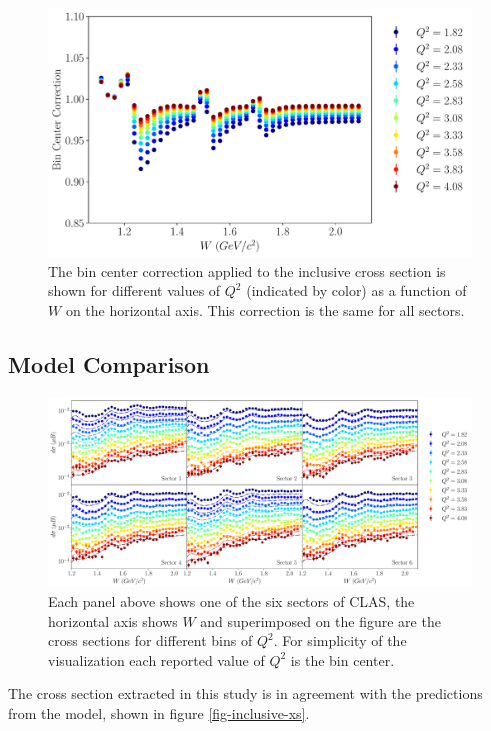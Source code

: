 \begin{figure}
	\centering
	\label{fig-bin-centering-correction} 
	\includegraphics[width=14cm]{image/plots/inclusive/bin_center_correction.pdf}
	\caption{The bin center correction applied to the inclusive cross section is shown for different values of $Q^2$ (indicated by color) as a function of $W$ on the horizontal axis.   This correction is the same for all sectors.}
\end{figure}

\subsection{Model Comparison}

\begin{figure}
	\centering
	\label{fig-inclusve-xs} 
	\includegraphics[width=\textwidth]{image/plots/inclusive/inclusive_xs.pdf}
	\caption{Each panel above shows one of the six sectors of CLAS, the horizontal axis shows $W$ and superimposed on the figure are the cross sections for different bins of $Q^2$.  For simplicity of the visualization each reported value of $Q^2$ is the bin center.}
\end{figure}

The cross section extracted in this study is in agreement with the predictions from the model, shown in figure \ref{fig-inclusive-xs}.  


